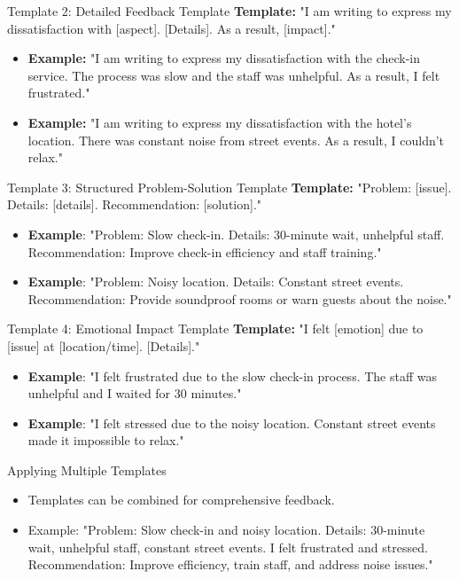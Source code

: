 \begin{frame}{Template 2: Detailed Feedback Template}
  \textbf{Template:} "I am writing to express my dissatisfaction with [aspect]. [Details]. As a result, [impact]."
  \begin{itemize}
    \item \textbf{Example:} "I am writing to express my dissatisfaction with the check-in service. The process was slow and the staff was unhelpful. As a result, I felt frustrated."
    \item \textbf{Example:} "I am writing to express my dissatisfaction with the hotel's location. There was constant noise from street events. As a result, I couldn't relax."
  \end{itemize}
\end{frame}

\begin{frame}{Template 3: Structured Problem-Solution Template}
    \textbf{Template:} "Problem: [issue]. Details: [details]. Recommendation: [solution]."
    \begin{itemize}
        \item \textbf{Example}: "Problem: Slow check-in. Details: 30-minute wait, unhelpful staff. Recommendation: Improve check-in efficiency and staff training."
        \item \textbf{Example}: "Problem: Noisy location. Details: Constant street events. Recommendation: Provide soundproof rooms or warn guests about the noise."
    \end{itemize}
\end{frame}

\begin{frame}{Template 4: Emotional Impact Template}
    \textbf{Template:} "I felt [emotion] due to [issue] at [location/time]. [Details]."
    \begin{itemize}
        \item \textbf{Example}: "I felt frustrated due to the slow check-in process. The staff was unhelpful and I waited for 30 minutes."
        \item \textbf{Example}: "I felt stressed due to the noisy location. Constant street events made it impossible to relax."
    \end{itemize}
\end{frame}

\begin{frame}{Applying Multiple Templates}
    \begin{itemize}
        \item Templates can be combined for comprehensive feedback.
        \item Example: "Problem: Slow check-in and noisy location. Details: 30-minute wait, unhelpful staff, constant street events. I felt frustrated and stressed. Recommendation: Improve efficiency, train staff, and address noise issues."
    \end{itemize}
\end{frame}

